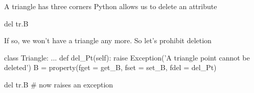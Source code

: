 \documentclass[hyperref={pdfpagelabels=false},table]{beamer}
\begin{document}
\begin{frame}[fragile]{A triangle has three corners}
Python allows us to delete an attribute
\vfill
\begin{python}
del tr.B
\end{python}
If so, we won't have a triangle any more. So let's prohibit deletion
\begin{python}
class Triangle:
    ...
    def del_Pt(self):
        raise Exception('A triangle point cannot be deleted')
    B = property(fget = get_B,
                 fset = set_B,
                 fdel = del_Pt)
\end{python}
\vfill
\begin{python}
del tr.B # now raises an exception
\end{python}

\end{frame}
\end{document}
